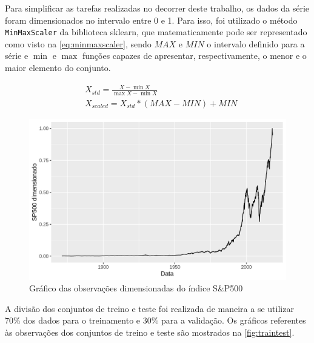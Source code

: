 \documentclass[
    12pt,
    oneside,
    a4paper,
    english,
    brazil
]{abntex2}
\begin{document}
Para simplificar as tarefas realizadas no  decorrer deste trabalho, os dados da
série foram dimensionados no intervalo entre 0  e 1. Para isso, foi utilizado o
método \texttt{MinMaxScaler}  da biblioteca  sklearn, que  matematicamente pode
ser representado como visto na \autoref{eq:minmaxscaler}, sendo $MAX$ e $MIN$ o
intervalo  definido  para  a  série  e  $\min$  e  $\max$  funções  capazes  de
apresentar, respectivamente, o menor e o maior elemento do conjunto.

\begin{equation}
    \begin{split}\label{eq:minmaxscaler}
        &X_{std} = \frac{X - \min X}{\max X-\min X}\\
        &X_{scaled} = X_{std} * (MAX-MIN)+MIN
    \end{split}
\end{equation}

\begin{figure}[ht]
    \centering
    \caption{Gráfico das observações dimensionadas do índice S\&P500}\label{fig:sp500}
    \includegraphics[width=.5\linewidth]{images/SP500.png}
\end{figure}

A  divisão dos  conjuntos de  treino  e teste  foi  realizada de  maneira a  se
utilizar 70\% dos dados para o treinamento e 30\% para a validação. Os gráficos
referentes às  observações dos  conjuntos de  treino e  teste são  mostrados na
\autoref{fig:traintest}.
\end{document}
